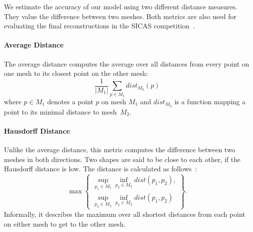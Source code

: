 We estimate the accuracy of our model using two different distance measures.
They value the difference between two meshes.
Both metrics are also used for evaluating the final reconstructions in the SICAS competition~\cite{smir}.

\paragraph{Average Distance}
The average distance computes the average over all distances from every point on one mesh to its closest point on the other mesh:
$$ \frac{1}{|M_1|} \sum_{p \in M_1} \mathit{dist}_{M_2}(p) $$
where $p \in M_1$ denotes a point $p$ on mesh $M_1$ and $\mathit{dist}_{M_2}$ is a function mapping a point to its minimal distance to mesh~$M_2$.

\paragraph{Hausdorff Distance}
Unlike the average distance, this metric computes the difference between two meshes in both directions.
Two shapes are said to be close to each other, if the Hausdorff distance is low.
The distance is calculated as follows~\cite{hausdorff}:
$$ \max \left\{ \begin{array}{ll}
  \sup_{p_1 \in M_1} \inf_{p_2 \in M_2} \mathit{dist}(p_1, p_2), \\
  \sup_{p_2 \in M_2} \inf_{p_2 \in M_2} \mathit{dist}(p_1, p_2) 
\end{array}\right\}. $$
Informally, it describes the maximum over all shortest distances from each point on either mesh to get to the other mesh.
